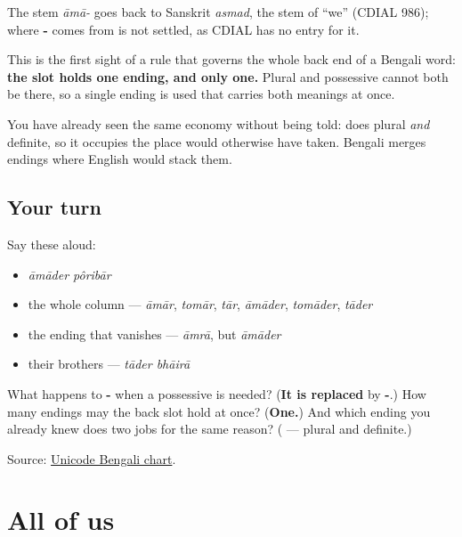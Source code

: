 \begin{cousinweb}
The stem \emph{āmā-} goes back to Sanskrit \emph{asmad}, the stem of \textquotedblleft{}we\textquotedblright{} (CDIAL 986); where \textbf{-} comes from is not settled, as CDIAL has no entry for it.
\end{cousinweb}

\begin{grammarlens}[title={Grammar Lens: one suffix at a time}]
This is the first sight of a rule that governs the whole back end of a Bengali word: \textbf{the slot holds one ending, and only one.} Plural and possessive cannot both be there, so a single ending is used that carries both meanings at once.

You have already seen the same economy without being told: \textbf{} does plural \emph{and} definite, so it occupies the place \textbf{} would otherwise have taken. Bengali merges endings where English would stack them.
\end{grammarlens}

\subsection*{Your turn}
Say these aloud:

\begin{itemize}
\raggedright
  \item \emph{āmāder pôribār}
  \item the whole column — \emph{āmār}, \emph{tomār}, \emph{tār}, \emph{āmāder}, \emph{tomāder}, \emph{tāder}
  \item the ending that vanishes — \emph{āmrā}, but \emph{āmāder}
  \item their brothers — \emph{tāder bhāirā}
\end{itemize}

\begin{tcolorbox}[breakable,colback=teal!4,colframe=teal!35!black,title={Before you move on}]
What happens to \textbf{-} when a possessive is needed? (\textbf{It is replaced} by \textbf{-}.) How many endings may the back slot hold at once? (\textbf{One.}) And which ending you already knew does two jobs for the same reason? (\textbf{} — plural and definite.)

Source: \href{https://www.unicode.org/charts/PDF/U0980.pdf}{Unicode Bengali chart}.
\end{tcolorbox}
\section[\texorpdfstring{\bn{আমরা} · \bn{তোমরা} … (āmrā · tomrā …)}{আমরা · তোমরা … (āmrā · tomrā …)}]{All of us}

